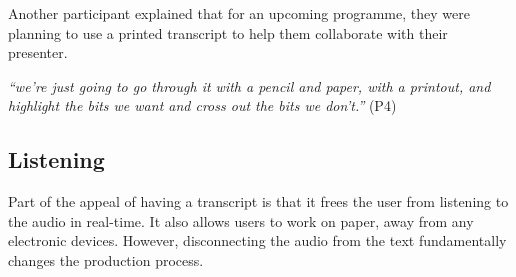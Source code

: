 


Another participant explained that for an upcoming programme, they were
planning to use a printed transcript to help them collaborate with their
presenter.

\textit{``we're just going to go through it with a pencil and paper, with a
  printout, and highlight the bits we want and cross out the bits we don't.''}
(P4)






\subsection{Listening}
Part of the appeal of having a transcript is that it frees the user from
listening to the audio in real-time. It also allows users to work on paper,
away from any electronic devices. However, disconnecting the audio from the
text fundamentally changes the production process.

